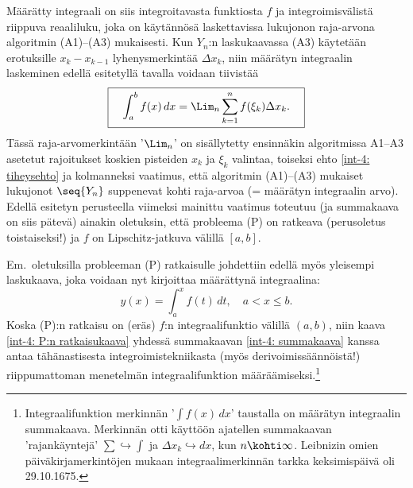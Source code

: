 Määrätty integraali on siis integroitavasta funktiosta $f$ ja integroimisvälistä riippuva
reaaliluku, joka on käytännösä laskettavissa lukujonon raja-arvona algoritmin (A1)--(A3)
mukaisesti. Kun $Y_n$:n laskukaavassa (A3) käytetään erotuksille $x_k-x_{k-1}$
lyhenysmerkintää $\Delta x_k$, niin määrätyn integraalin laskeminen edellä esitetyllä tavalla
voidaan tiivistää  
\begin{equation} \label{int-4: summakaava}
\boxed{\quad \int_a^b f(x)\,dx = \Lim_n \sum_{k=1}^n f(\xi_k)\Delta x_k. \quad}
\end{equation}
%
Tässä raja-arvomerkintään '$\Lim_n$' on sisällytetty ensinnäkin algoritmissa A1--A3 asetetut
rajoitukset koskien pisteiden $x_k$ ja $\xi_k$ valintaa, toiseksi ehto
\eqref{int-4: tiheysehto} ja kolmanneksi vaatimus, että  algoritmin (A1)--(A3)
mukaiset lukujonot $\seq{Y_n}$ suppenevat kohti  raja-arvoa (= määrätyn integraalin
arvo). Edellä esitetyn perusteella viimeksi mainittu vaatimus toteutuu (ja summakaava on siis
pätevä) ainakin oletuksin, että probleema (P) on ratkeava (perusoletus toistaiseksi!) ja $f$ on
Lipschitz-jatkuva välillä $[a,b]$.

Em.\ oletuksilla probleeman (P) ratkaisulle johdettiin edellä myös yleisempi laskukaava, joka
voidaan nyt kirjoittaa määrättynä integraalina:
\begin{equation} \label{int-4: P:n ratkaisukaava}
y(x)=\int_a^x f(t)\,dt, \quad a < x \le b.
\end{equation}
Koska (P):n ratkaisu on (eräs) $f$:n integraalifunktio välillä $(a,b)$, niin kaava
\eqref{int-4: P:n ratkaisukaava} yhdessä summakaavan \eqref{int-4: summakaava} kanssa antaa
tähänastisesta integroimistekniikasta (myös derivoimissäännöistä!) riippumattoman menetelmän
integraalifunktion määräämiseksi.\footnote[2]{Integraalifunktion merkinnän '$\int f(x)\,dx$'
taustalla on määrätyn integraalin summakaava. Merkinnän otti käyttöön 
ajatellen summakaavan 'rajankäyntejä' $\sum\hookrightarrow\int$ ja
$\Delta x_k\hookrightarrow dx$, kun $n\kohti\infty$. Leibnizin omien päiväkirjamerkintöjen
mukaan integraalimerkinnän tarkka keksimispäivä oli 29.10.1675. }

